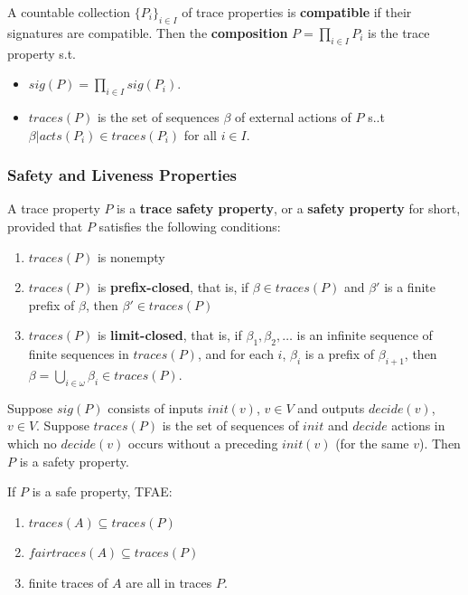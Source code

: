 \documentclass[11pt]{article}
\begin{document}
A countable collection \(\{P_i\}_{i\in I}\) of trace properties is \textbf{compatible} if their signatures are
compatible. Then the \textbf{composition} \(P=\prod_{i\in I}P_i\) is the trace property s.t.
\begin{itemize}
\item \(sig(P)=\prod_{i\in I}sig(P_i)\).
\item \(traces(P)\) is the set of sequences \(\beta\) of external actions of \(P\) s..t
\(\beta|acts(P_i)\in traces(P_i)\) for all \(i\in I\).
\end{itemize}
\subsubsection{Safety and Liveness Properties}
\label{sec:org8f98f5d}
\begin{definition}[]
A trace property \(P\) is a \textbf{trace safety property}, or a \textbf{safety property} for short, provided that \(P\)
satisfies the following conditions:
\begin{enumerate}
\item \(traces(P)\) is nonempty
\item \(traces(P)\) is \textbf{prefix-closed}, that is, if \(\beta\in traces(P)\) and \(\beta'\) is a finite
prefix of \(\beta\), then \(\beta'\in traces(P)\)
\item \(traces(P)\) is \textbf{limit-closed}, that is, if \(\beta_1,\beta_2,\dots\) is an infinite sequence of
finite sequences in \(traces(P)\), and for each \(i\), \(\beta_i\) is a prefix of \(\beta_{i+1}\),
then \(\beta=\bigcup_{i\in\omega}\beta_i\in traces(P)\).
\end{enumerate}
\end{definition}

\begin{examplle}
Suppose \(sig(P)\) consists of inputs \(init(v)\), \(v\in V\) and outputs \(decide(v)\), \(v\in V\).
Suppose \(traces(P)\) is the set of sequences of \(init\) and \(decide\) actions in which no
\(decide(v)\) occurs without a preceding \(init(v)\) (for the same \(v\)). Then \(P\) is a safety property.
\end{examplle}

\begin{proposition}[]
If \(P\) is a safe property, TFAE:
\begin{enumerate}
\item \(traces(A)\subseteq traces(P)\)
\item \(fairtraces(A)\subseteq traces(P)\)
\item finite traces of \(A\) are all in traces \(P\).
\end{enumerate}
\end{proposition}
\end{document}
